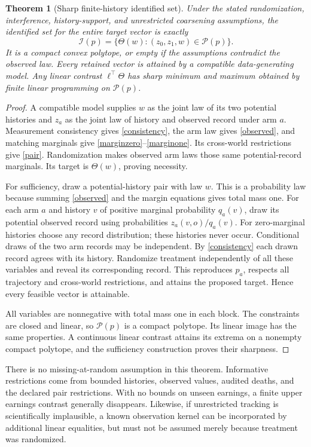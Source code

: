 \documentclass[11pt]{article}
\newtheorem{theorem}{Theorem}
\theoremstyle{remark}
\begin{document}
\begin{theorem}[Sharp finite-history identified set]\label{sharp}
Under the stated randomization, interference, history-support, and unrestricted coarsening assumptions, the identified set for the entire target vector is exactly
\[
 \mathcal I(p)=\{\Theta(w):(z_0,z_1,w)\in\mathcal P(p)\}.
\]
It is a compact convex polytope, or empty if the assumptions contradict the observed law. Every retained vector is attained by a compatible data-generating model. Any linear contrast $\ell^\top\Theta$ has sharp minimum and maximum obtained by finite linear programming on $\mathcal P(p)$.
\end{theorem}
\begin{proof}
A compatible model supplies $w$ as the joint law of its two potential histories and $z_a$ as the joint law of history and observed record under arm $a$. Measurement consistency gives \eqref{consistency}, the arm law gives \eqref{observed}, and matching marginals give \eqref{marginzero}--\eqref{marginone}. Its cross-world restrictions give \eqref{pair}. Randomization makes observed arm laws those same potential-record marginals. Its target is $\Theta(w)$, proving necessity.

For sufficiency, draw a potential-history pair with law $w$. This is a probability law because summing \eqref{observed} and the margin equations gives total mass one. For each arm $a$ and history $v$ of positive marginal probability $q_a(v)$, draw its potential observed record using probabilities $z_a(v,o)/q_a(v)$. For zero-marginal histories choose any record distribution; these histories never occur. Conditional draws of the two arm records may be independent. By \eqref{consistency} each drawn record agrees with its history. Randomize treatment independently of all these variables and reveal its corresponding record. This reproduces $p_a$, respects all trajectory and cross-world restrictions, and attains the proposed target. Hence every feasible vector is attainable.

All variables are nonnegative with total mass one in each block. The constraints are closed and linear, so $\mathcal P(p)$ is a compact polytope. Its linear image has the same properties. A continuous linear contrast attains its extrema on a nonempty compact polytope, and the sufficiency construction proves their sharpness.
\end{proof}

There is no missing-at-random assumption in this theorem. Informative restrictions come from bounded histories, observed values, audited deaths, and the declared pair restrictions. With no bounds on unseen earnings, a finite upper earnings contrast generally disappears. Likewise, if unrestricted tracking is scientifically implausible, a known observation kernel can be incorporated by additional linear equalities, but must not be assumed merely because treatment was randomized.
\end{document}
